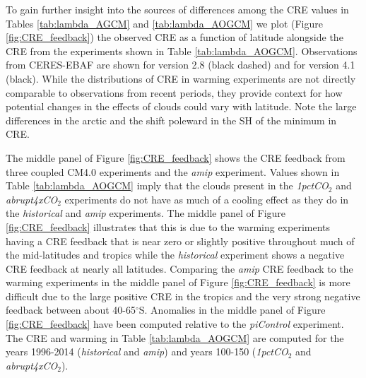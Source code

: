\documentclass[draft]{agujournal2019}
\begin{document}
To gain further insight into the sources of differences among the CRE values in Tables  \ref{tab:lambda_AGCM}  and  
\ref{tab:lambda_AOGCM}  we plot (Figure \ref{fig:CRE_feedback}) the observed CRE as a function of latitude alongside the CRE from the 
experiments shown in Table  \ref{tab:lambda_AOGCM}.  Observations from CERES-EBAF are shown for version 
2.8 (black dashed) and for version 4.1 (black).  
While the distributions of CRE in warming experiments are not directly comparable to observations from recent periods, they provide context for how potential changes in the effects of clouds could vary with latitude.   
Note the large differences in the arctic and the shift poleward in the SH of the minimum in CRE.    

The middle panel of Figure \ref{fig:CRE_feedback} shows the CRE feedback from three coupled CM4.0 experiments and the \textit{amip} experiment.  Values shown in Table \ref{tab:lambda_AOGCM} imply that the clouds present in the \textit{1pctCO$_2$} and \textit{abrupt4xCO$_2$} experiments
do not have as much of a cooling effect as they do in the \textit{historical} and \textit{amip} experiments.  The middle panel of Figure \ref{fig:CRE_feedback} illustrates that this is due to the warming experiments having a CRE feedback that is near zero or slightly positive throughout much of the mid-latitudes and tropics while the \textit{historical} experiment shows a negative CRE feedback at nearly all latitudes.  Comparing the \textit{amip} CRE feedback to the warming experiments in the 
middle panel of Figure \ref{fig:CRE_feedback} is more difficult due to the large positive CRE in the tropics and the very strong negative feedback between about 40-65$^{\circ}$S.  Anomalies in the middle panel of Figure \ref{fig:CRE_feedback} have been computed relative to the \textit{piControl} experiment.  The CRE and warming in Table \ref{tab:lambda_AOGCM} are 
computed for the years 1996-2014 (\textit{historical} and \textit{amip}) and years 100-150 (\textit{1pctCO$_2$} and \textit{abrupt4xCO$_2$}).   
\end{document}
